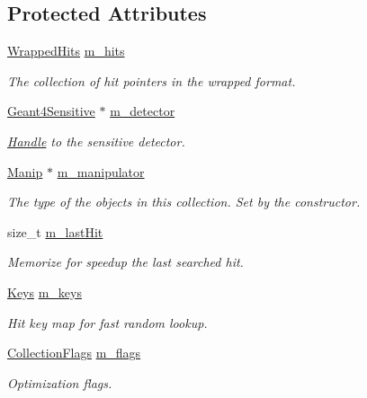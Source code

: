 \subsection*{Protected Attributes}
\begin{DoxyCompactItemize}
\item 
\hyperlink{class_d_d4hep_1_1_simulation_1_1_geant4_hit_collection_ada2cbec73b2d5005b514a33b44a1dc05}{Wrapped\+Hits} \hyperlink{class_d_d4hep_1_1_simulation_1_1_geant4_hit_collection_a8a2e237f209928a1598ccf0b72cd3d44}{m\+\_\+hits}
\begin{DoxyCompactList}\small\item\em The collection of hit pointers in the wrapped format. \end{DoxyCompactList}\item 
\hyperlink{class_d_d4hep_1_1_simulation_1_1_geant4_sensitive}{Geant4\+Sensitive} $\ast$ \hyperlink{class_d_d4hep_1_1_simulation_1_1_geant4_hit_collection_aaf3c4ccd370663a99af26333af3486e7}{m\+\_\+detector}
\begin{DoxyCompactList}\small\item\em \hyperlink{class_d_d4hep_1_1_handle}{Handle} to the sensitive detector. \end{DoxyCompactList}\item 
\hyperlink{class_d_d4hep_1_1_simulation_1_1_geant4_hit_collection_a7a4b540fa0c4983ebd755a049a2794b7}{Manip} $\ast$ \hyperlink{class_d_d4hep_1_1_simulation_1_1_geant4_hit_collection_ab65b438cada304dbfe15f9be6a329001}{m\+\_\+manipulator}
\begin{DoxyCompactList}\small\item\em The type of the objects in this collection. Set by the constructor. \end{DoxyCompactList}\item 
size\+\_\+t \hyperlink{class_d_d4hep_1_1_simulation_1_1_geant4_hit_collection_a67cef40b22ad50d9c6a5fdd620e1786f}{m\+\_\+last\+Hit}
\begin{DoxyCompactList}\small\item\em Memorize for speedup the last searched hit. \end{DoxyCompactList}\item 
\hyperlink{class_d_d4hep_1_1_simulation_1_1_geant4_hit_collection_a0d4d87fb90cf83dceff0b43928426135}{Keys} \hyperlink{class_d_d4hep_1_1_simulation_1_1_geant4_hit_collection_a3d45d2544cef7139ad425c2abc66c45a}{m\+\_\+keys}
\begin{DoxyCompactList}\small\item\em Hit key map for fast random lookup. \end{DoxyCompactList}\item 
\hyperlink{union_d_d4hep_1_1_simulation_1_1_geant4_hit_collection_1_1_collection_flags}{Collection\+Flags} \hyperlink{class_d_d4hep_1_1_simulation_1_1_geant4_hit_collection_a9c557501c37d783cbc1be1443aef03a9}{m\+\_\+flags}
\begin{DoxyCompactList}\small\item\em Optimization flags. \end{DoxyCompactList}\end{DoxyCompactItemize}


